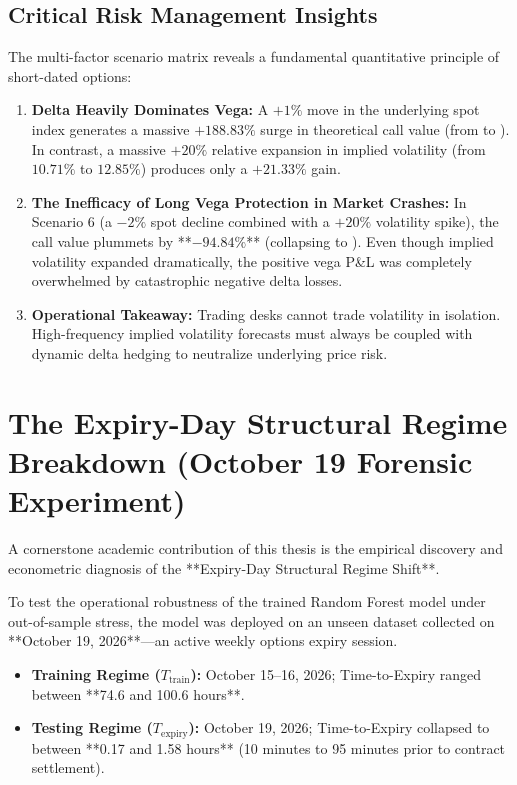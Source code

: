 \subsection{Critical Risk Management Insights}
The multi-factor scenario matrix reveals a fundamental quantitative principle of short-dated options:
\begin{enumerate}
    \item \textbf{Delta Heavily Dominates Vega:}
    A $+1\%$ move in the underlying spot index generates a massive $+188.83\%$ surge in theoretical call value (from  to ). In contrast, a massive $+20\%$ relative expansion in implied volatility (from $10.71\%$ to $12.85\%$) produces only a $+21.33\%$ gain.
    \item \textbf{The Inefficacy of Long Vega Protection in Market Crashes:}
    In Scenario 6 (a $-2\%$ spot decline combined with a $+20\%$ volatility spike), the call value plummets by **$-94.84\%$** (collapsing to ). Even though implied volatility expanded dramatically, the positive vega P\&L was completely overwhelmed by catastrophic negative delta losses.
    \item \textbf{Operational Takeaway:} Trading desks cannot trade volatility in isolation. High-frequency implied volatility forecasts must always be coupled with dynamic delta hedging to neutralize underlying price risk.
\end{enumerate}

\section{The Expiry-Day Structural Regime Breakdown (October 19 Forensic Experiment)}
\label{sec:expiry_day_breakdown}

A cornerstone academic contribution of this thesis is the empirical discovery and econometric diagnosis of the **Expiry-Day Structural Regime Shift**.

To test the operational robustness of the trained Random Forest model under out-of-sample stress, the model was deployed on an unseen dataset collected on **October 19, 2026**—an active weekly options expiry session.
\begin{itemize}
    \item \textbf{Training Regime ($T_{\text{train}}$):} October 15--16, 2026; Time-to-Expiry ranged between **74.6 and 100.6 hours**.
    \item \textbf{Testing Regime ($T_{\text{expiry}}$):} October 19, 2026; Time-to-Expiry collapsed to between **0.17 and 1.58 hours** (10 minutes to 95 minutes prior to contract settlement).
\end{itemize}

